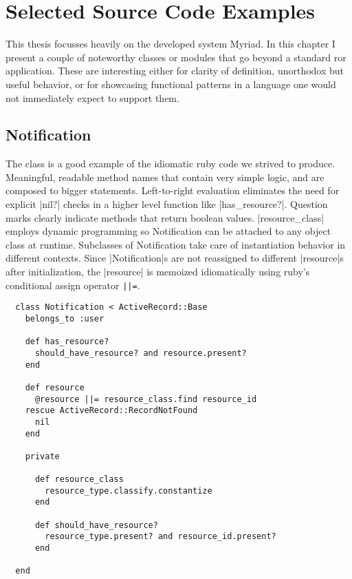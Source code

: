 \chapter{Selected Source Code Examples}
\label{chapter:CodeExamples}

This thesis focusses heavily on the developed system Myriad. In this chapter I present a couple of noteworthy classes or modules that go beyond a standard \gls{ror} application. These are interesting either for clarity of definition, unorthodox but useful behavior, or for showcasing functional patterns in a language one would not immediately expect to support them.

\section{Notification}

The  class is a good example of the idiomatic \gls{ruby} code we strived to produce. Meaningful, readable method names that contain very simple logic, and are composed to bigger statements. Left-to-right evaluation eliminates the need for explicit |nil?| checks in a higher level function like |has_resource?|. Question marks clearly indicate methods that return boolean values. |resource_class| employs dynamic programming so Notification can be attached to any object class at runtime. Subclasses of Notification take care of instantiation behavior in different contexts. Since |Notification|s are not reassigned to different |resource|s after initialization, the |resource| is memoized idiomatically using \gls{ruby}'s conditional assign operator \lstinline{||=}.

\begin{lstlisting}
  class Notification < ActiveRecord::Base
    belongs_to :user

    def has_resource?
      should_have_resource? and resource.present?
    end

    def resource
      @resource ||= resource_class.find resource_id
    rescue ActiveRecord::RecordNotFound
      nil
    end
    
    private
  
      def resource_class
        resource_type.classify.constantize
      end
    
      def should_have_resource?
        resource_type.present? and resource_id.present?
      end
   
  end
\end{lstlisting}


